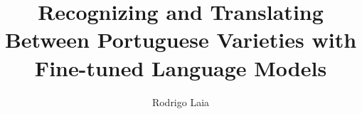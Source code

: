 \documentclass[acmtog]{acmart}
\begin{document}
\title{Recognizing and Translating Between Portuguese Varieties with Fine-tuned Language Models}

\author{Rodrigo Laia}
\authornotemark[1]


\renewcommand{\shortauthors}{Laia et al.}

\begin{abstract}

\end{abstract}

\end{document}
